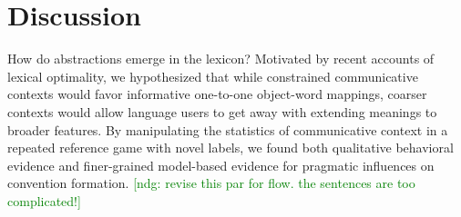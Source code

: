 \documentclass[10pt,letterpaper]{article}
\newcommand{\ndg}[1]{\textcolor{Green}{[ndg: #1]}}
\begin{document}



\section{Discussion}

How do abstractions emerge in the lexicon? Motivated by recent accounts of lexical optimality, we hypothesized that while constrained communicative contexts would favor informative one-to-one object-word mappings, coarser contexts would allow language users to get away with extending meanings to broader features. By manipulating the statistics of communicative context in a repeated reference game with novel labels, we found both qualitative behavioral evidence and finer-grained model-based evidence for pragmatic influences on convention formation. \ndg{revise this par for flow. the sentences are too complicated!}
\end{document}
